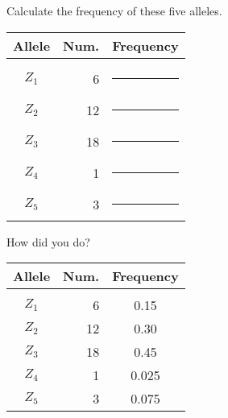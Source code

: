 \documentclass[t]{beamer}
\begin{document}
%
%
%	
%	
%	
%	
%	
%	
%

\begin{frame}[t]{Calculate the frequency of these five alleles.}
	
	\begin{longtable}[c]{@{}crc@{}}
		\toprule
		Allele	& Num.  & Frequency \tabularnewline
		\midrule
		& & \tabularnewline[-1ex]
		$Z_1$ & 6 & \rule{0.5in}{0.4pt} \tabularnewline[1.5ex]
		$Z_2$ & 12 & \rule{0.5in}{0.4pt} \tabularnewline[1.5ex]
		$Z_3$ & 18 & \rule{0.5in}{0.4pt} \tabularnewline[1.5ex]
		$Z_4$ & 1 & \rule{0.5in}{0.4pt} \tabularnewline[1.5ex]
		$Z_5$ & 3 & \rule{0.5in}{0.4pt} \tabularnewline[1.5ex]
		\bottomrule
	\end{longtable}
\end{frame}
%

\begin{frame}[t]{How did you do?}
	
	\begin{longtable}[c]{@{}crc@{}}
		\toprule
		Allele	& Num.  & Frequency \tabularnewline
		\midrule
		& & \tabularnewline[-1ex]
		$Z_1$ & 6 & {0.15} \tabularnewline[1.5ex]
		$Z_2$ & 12 & {0.30} \tabularnewline[1.5ex]
		$Z_3$ & 18 & {0.45} \tabularnewline[1.5ex]
		$Z_4$ & 1 & {0.025} \tabularnewline[1.5ex]
		$Z_5$ & 3 & {0.075} \tabularnewline[1.5ex]
		\bottomrule
	\end{longtable}
\end{frame}
%
%	
%	
%	
%	
%
\end{document}
